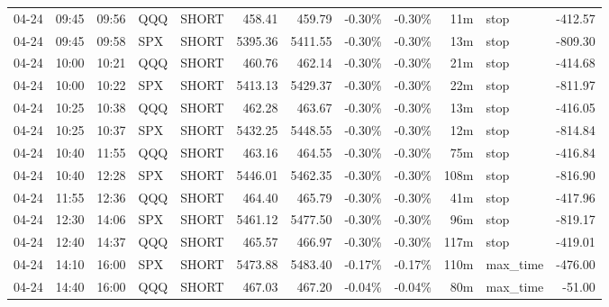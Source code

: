 \documentclass[11pt,a4paper,twoside]{article}
\begin{document}
\begin{center}
\begin{longtable}{>{\color{txtmain}}l l l l l r r r r r >{\color{txtmain}}l r}
04-24 & 09:45 & 09:56 & QQQ & SHORT & 458.41 & 459.79 & \textcolor{lossred}{-0.30\%} & \textcolor{lossred}{-0.30\%} & 11m & stop & \textcolor{lossred}{-412.57} \\
04-24 & 09:45 & 09:58 & SPX & SHORT & 5395.36 & 5411.55 & \textcolor{lossred}{-0.30\%} & \textcolor{lossred}{-0.30\%} & 13m & stop & \textcolor{lossred}{-809.30} \\
04-24 & 10:00 & 10:21 & QQQ & SHORT & 460.76 & 462.14 & \textcolor{lossred}{-0.30\%} & \textcolor{lossred}{-0.30\%} & 21m & stop & \textcolor{lossred}{-414.68} \\
04-24 & 10:00 & 10:22 & SPX & SHORT & 5413.13 & 5429.37 & \textcolor{lossred}{-0.30\%} & \textcolor{lossred}{-0.30\%} & 22m & stop & \textcolor{lossred}{-811.97} \\
04-24 & 10:25 & 10:38 & QQQ & SHORT & 462.28 & 463.67 & \textcolor{lossred}{-0.30\%} & \textcolor{lossred}{-0.30\%} & 13m & stop & \textcolor{lossred}{-416.05} \\
04-24 & 10:25 & 10:37 & SPX & SHORT & 5432.25 & 5448.55 & \textcolor{lossred}{-0.30\%} & \textcolor{lossred}{-0.30\%} & 12m & stop & \textcolor{lossred}{-814.84} \\
04-24 & 10:40 & 11:55 & QQQ & SHORT & 463.16 & 464.55 & \textcolor{lossred}{-0.30\%} & \textcolor{lossred}{-0.30\%} & 75m & stop & \textcolor{lossred}{-416.84} \\
04-24 & 10:40 & 12:28 & SPX & SHORT & 5446.01 & 5462.35 & \textcolor{lossred}{-0.30\%} & \textcolor{lossred}{-0.30\%} & 108m & stop & \textcolor{lossred}{-816.90} \\
04-24 & 11:55 & 12:36 & QQQ & SHORT & 464.40 & 465.79 & \textcolor{lossred}{-0.30\%} & \textcolor{lossred}{-0.30\%} & 41m & stop & \textcolor{lossred}{-417.96} \\
04-24 & 12:30 & 14:06 & SPX & SHORT & 5461.12 & 5477.50 & \textcolor{lossred}{-0.30\%} & \textcolor{lossred}{-0.30\%} & 96m & stop & \textcolor{lossred}{-819.17} \\
04-24 & 12:40 & 14:37 & QQQ & SHORT & 465.57 & 466.97 & \textcolor{lossred}{-0.30\%} & \textcolor{lossred}{-0.30\%} & 117m & stop & \textcolor{lossred}{-419.01} \\
04-24 & 14:10 & 16:00 & SPX & SHORT & 5473.88 & 5483.40 & \textcolor{lossred}{-0.17\%} & \textcolor{lossred}{-0.17\%} & 110m & max\_time & \textcolor{lossred}{-476.00} \\
04-24 & 14:40 & 16:00 & QQQ & SHORT & 467.03 & 467.20 & \textcolor{lossred}{-0.04\%} & \textcolor{lossred}{-0.04\%} & 80m & max\_time & \textcolor{lossred}{-51.00} \\

\end{longtable}
\end{center}
\end{document}

